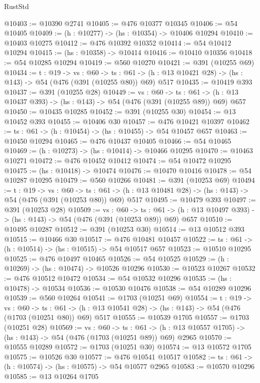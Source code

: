 \begin{lexlean}{RustStd}
\begin{coremodule}
@10403 := @10390 @2741
@10405 := @476 @10377 @10345
@10406 := @54 @10405
@10409 := (h : @10277) -> (hs : @10354) -> @10406 @10294
@10410 := @10403 @10275
@10412 := @476 @10392 @10352
@10414 := @54 @10412 @10294
@10415 := (hs : @10358) -> @10414
@10416 := @10410 @10356
@10418 := @54 @10285 @10294
@10419 := @560 @10270
@10421 := @391 (@10255 @69)
@10434 := {t : @19} ->
  {vs : @60} ->
  {ts : @61} -> (h : @13 @10421 @28) -> (hs : @143) -> @54 (@476 (@391 (@10255 @80)) @69) @517
@10435 := @10419 @393
@10437 := @391 (@10255 @28)
@10449 := {vs : @60} ->
  {ts : @61} -> (h : @13 @10437 @393) -> (hs : @143) -> @54 (@476 (@391 (@10255 @89)) @69) @657
@10450 := @10435 @10285
@10452 := @391 (@10255 @30)
@10454 := @13 @10452 @393
@10455 := @10406 @30
@10457 := @476 @10421 @10397
@10462 := {ts : @61} -> (h : @10454) -> (hs : @10455) -> @54 @10457 @657
@10463 := @10450 @10294
@10465 := @476 @10437 @10405
@10466 := @54 @10465
@10469 := (h : @10273) -> (hs : @10414) -> @10466 @10295
@10470 := @10463 @10271
@10472 := @476 @10452 @10412
@10474 := @54 @10472 @10295
@10475 := (hs : @10418) -> @10474
@10476 := @10470 @10416
@10478 := @54 @10287 @10295
@10479 := @560 @10266
@10481 := @391 (@10253 @69)
@10494 := {t : @19} ->
  {vs : @60} ->
  {ts : @61} -> (h : @13 @10481 @28) -> (hs : @143) -> @54 (@476 (@391 (@10253 @80)) @69) @517
@10495 := @10479 @393
@10497 := @391 (@10253 @28)
@10509 := {vs : @60} ->
  {ts : @61} -> (h : @13 @10497 @393) -> (hs : @143) -> @54 (@476 (@391 (@10253 @89)) @69) @657
@10510 := @10495 @10287
@10512 := @391 (@10253 @30)
@10514 := @13 @10512 @393
@10515 := @10466 @30
@10517 := @476 @10481 @10457
@10522 := {ts : @61} -> (h : @10514) -> (hs : @10515) -> @54 @10517 @657
@10523 := @10510 @10295
@10525 := @476 @10497 @10465
@10526 := @54 @10525
@10529 := (h : @10269) -> (hs : @10474) -> @10526 @10296
@10530 := @10523 @10267
@10532 := @476 @10512 @10472
@10534 := @54 @10532 @10296
@10535 := (hs : @10478) -> @10534
@10536 := @10530 @10476
@10538 := @54 @10289 @10296
@10539 := @560 @10264
@10541 := @1703 (@10251 @69)
@10554 := {t : @19} ->
  {vs : @60} ->
  {ts : @61} -> (h : @13 @10541 @28) -> (hs : @143) -> @54 (@476 (@1703 (@10251 @80)) @69) @517
@10555 := @10539 @1705
@10557 := @1703 (@10251 @28)
@10569 := {vs : @60} ->
  {ts : @61} -> (h : @13 @10557 @1705) -> (hs : @143) -> @54 (@476 (@1703 (@10251 @89)) @69) @2965
@10570 := @10555 @10289
@10572 := @1703 (@10251 @30)
@10574 := @13 @10572 @1705
@10575 := @10526 @30
@10577 := @476 @10541 @10517
@10582 := {ts : @61} -> (h : @10574) -> (hs : @10575) -> @54 @10577 @2965
@10583 := @10570 @10296
@10585 := @13 @10264 @1705

\end{coremodule}
\end{lexlean}
